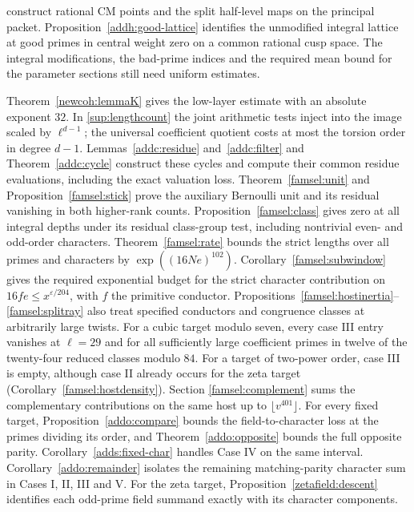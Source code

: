 \begin{description}
construct rational CM points and the split half-level maps on the
principal packet. Proposition~\ref{addh:good-lattice} identifies the
unmodified integral lattice at good primes in central weight zero
on a common rational cusp space. The integral modifications, the
bad-prime indices and the required mean bound for the parameter
sections still need uniform estimates.
\item[Integral cohomology and deformation rings.]
Theorem~\ref{newcoh:lemmaK} gives the low-layer estimate with an absolute
exponent \(32\). In \eqref{sup:lengthcount} the joint arithmetic tests
inject into the image scaled by \(\ell^{d-1}\); the universal
coefficient quotient costs at most the torsion order in degree
\(d-1\). Lemmas~\ref{addc:residue} and~\ref{addc:filter} and
Theorem~\ref{addc:cycle} construct these cycles and compute their
common residue evaluations, including the exact valuation loss.
Theorem~\ref{famsel:unit} and Proposition~\ref{famsel:stick}
prove the auxiliary Bernoulli unit and its residual vanishing in both
higher-rank counts. Proposition~\ref{famsel:class} gives zero at
all integral depths under its residual class-group test, including
nontrivial even- and odd-order characters. Theorem~\ref{famsel:rate}
bounds the strict lengths over all primes and characters by
\(\exp((16Ne)^{102})\). Corollary~\ref{famsel:subwindow} gives the
required exponential budget for the strict character contribution on
\(16fe\le x^{\varepsilon/204}\), with \(f\) the primitive conductor.
Propositions~\ref{famsel:hostinertia}--\ref{famsel:splitray} also
treat specified conductors and congruence classes at arbitrarily
large twists. For a cubic target modulo seven, every case III entry
vanishes at \(\ell=29\) and for all sufficiently large coefficient
primes in twelve of the twenty-four reduced classes modulo \(84\).
For a target of two-power order, case III is empty, although case II
already occurs for the zeta target (Corollary~\ref{famsel:hostdensity}). Section
\ref{famsel:complement} sums the complementary contributions on the
same host up to \(\lfloor v^{401}\rfloor\).
For every fixed target, Proposition~\ref{addo:compare} bounds the
field-to-character loss at the primes dividing its order, and
Theorem~\ref{addo:opposite} bounds the full opposite parity.
Corollary~\ref{adds:fixed-char} handles Case IV on the same interval.
Corollary~\ref{addo:remainder} isolates the remaining matching-parity
character sum in Cases I, II, III and V. For the zeta target, Proposition~\ref{zetafield:descent}
identifies each odd-prime field summand exactly with its character components.

\end{description}
